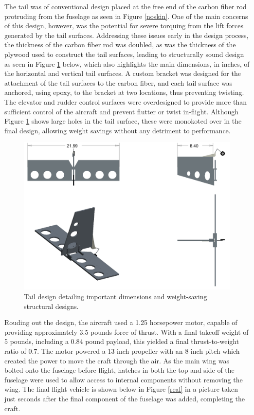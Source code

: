 \documentclass[titlepage]{article}
\begin{document}
The tail was of conventional design placed at the free end of the carbon fiber rod protruding from the fuselage as seen in Figure \ref{noskin}. One of the main concerns of this design, however, was the potential for severe torquing from the lift forces generated by the tail surfaces. Addressing these issues early in the design process, the thickness of the carbon fiber rod was doubled, as was the thickness of the plywood used to construct the tail surfaces, leading to structurally sound design as seen in Figure \ref{tail} below, which also highlights the main dimensions, in inches, of the horizontal and vertical tail surfaces. A custom bracket was designed for the attachment of the tail surfaces to the carbon fiber, and each tail surface was anchored, using epoxy, to the bracket at two locations, thus preventing twisting. The elevator and rudder control surfaces were overdesigned to provide more than sufficient control of the aircraft and prevent flutter or twist in-flight. Although Figure \ref{tail} shows large holes in the tail surface, these were monokoted over in the final design, allowing weight savings without any detriment to performance.

\begin{figure}[h]
 \includegraphics[width=1\columnwidth]{Tail_Design.png}
 \caption{Tail design detailing important dimensions and weight-saving structural designs.}
\label{tail}
\end{figure}
 
Rouding out the design, the aircraft used a 1.25 horsepower motor, capable of providing approximately 3.5 pounds-force of thrust. With a final takeoff weight of 5 pounds, including a 0.84 pound payload, this yielded a final thrust-to-weight ratio of 0.7. The motor powered a 13-inch propeller with an 8-inch pitch which created the power to move the craft through the air. As the main wing was bolted onto the fuselage before flight, hatches in both the top and side of the fuselage were used to allow access to internal components without removing the wing. The final flight vehicle is shown below in Figure \ref{real} in a picture taken just seconds after the final component of the fuselage was added, completing the craft.
\end{document}
